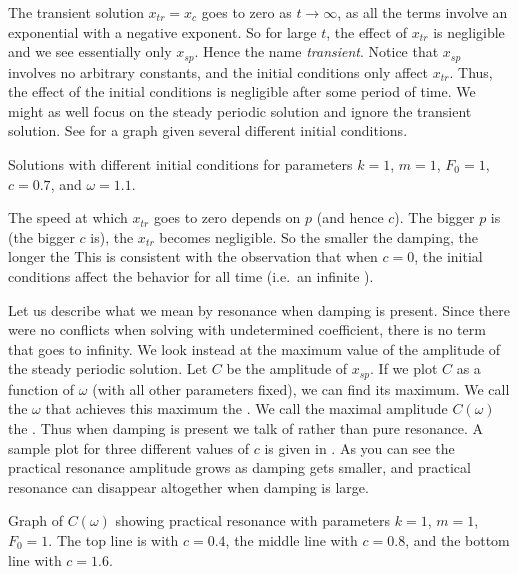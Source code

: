 The transient solution $x_{tr} = x_c$ goes to zero as $t \to \infty$,
as all the terms involve an exponential with a negative exponent.  So
for large $t$, the effect of $x_{tr}$ is negligible and we see essentially
only $x_{sp}$.
Hence the name \emph{transient}.
Notice that $x_{sp}$ involves no arbitrary constants, and
the initial conditions only affect $x_{tr}$.  Thus, the effect
of the initial conditions is negligible after some period of time.
We might as well focus on the
steady periodic solution and ignore the transient solution.  See
 for a graph given several different initial conditions.

\begin{mywrapfig}{3.25in}
\capstart
{}
\caption{Solutions with different initial conditions for parameters
$k=1$, $m=1$, $F_0 = 1$, $c=0.7$, and $\omega=1.1$.\label{3.6:transbehfig}}
\end{mywrapfig}

The speed at which $x_{tr}$ goes to zero depends on $p$ (and
hence $c$).  The
bigger $p$ is (the bigger $c$ is), the  $x_{tr}$ becomes negligible. 
So the smaller the damping, the longer the 
This is consistent
with the observation that when $c=0$, the initial conditions affect the
behavior for all time (i.e.\ an infinite ).

\medskip

Let us describe what we mean by resonance when damping is present.
Since there were no conflicts when solving with undetermined coefficient,
there is no term that goes to infinity.  We look instead at the
maximum value of the amplitude of the steady periodic solution.
Let $C$ be the amplitude of $x_{sp}$.
If we plot $C$ as a function of $\omega$ (with all other
parameters fixed), we can find its maximum.
We call the $\omega$ that achieves this maximum
the \emph{}.
We call the maximal amplitude $C(\omega)$
the \emph{}.
Thus when damping is present we talk of \emph{}
rather than pure resonance.
A sample plot for three different
values of $c$ is given in .  As you can see the
practical resonance amplitude grows as damping gets smaller, and 
practical resonance can disappear altogether when damping is large.

\begin{myfig}
\capstart
{}
\caption{Graph of $C(\omega)$ showing practical resonance with parameters
$k=1$, $m=1$, $F_0 = 1$. The top line is with $c=0.4$, the middle line with
$c=0.8$, and the bottom line with
$c=1.6$.\label{3.6:pracresfig}}
\end{myfig}

